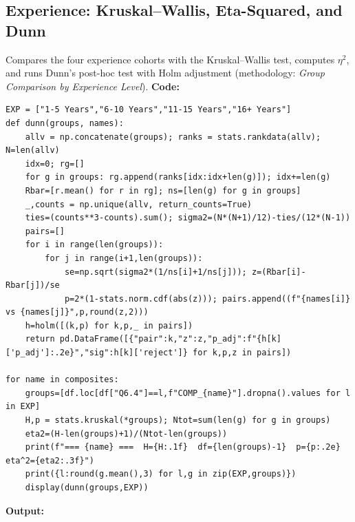 \subsection{Experience: Kruskal--Wallis, Eta-Squared, and Dunn}
Compares the four experience cohorts with the Kruskal--Wallis test, computes $\eta^2$, and runs Dunn's post-hoc test with Holm adjustment (methodology: \emph{Group Comparison by Experience Level}).
\noindent\textbf{Code:}\nopagebreak
{\tiny\begin{verbatim}
EXP = ["1-5 Years","6-10 Years","11-15 Years","16+ Years"]
def dunn(groups, names):
    allv = np.concatenate(groups); ranks = stats.rankdata(allv); N=len(allv)
    idx=0; rg=[]
    for g in groups: rg.append(ranks[idx:idx+len(g)]); idx+=len(g)
    Rbar=[r.mean() for r in rg]; ns=[len(g) for g in groups]
    _,counts = np.unique(allv, return_counts=True)
    ties=(counts**3-counts).sum(); sigma2=(N*(N+1)/12)-ties/(12*(N-1))
    pairs=[]
    for i in range(len(groups)):
        for j in range(i+1,len(groups)):
            se=np.sqrt(sigma2*(1/ns[i]+1/ns[j])); z=(Rbar[i]-Rbar[j])/se
            p=2*(1-stats.norm.cdf(abs(z))); pairs.append((f"{names[i]} vs {names[j]}",p,round(z,2)))
    h=holm([(k,p) for k,p,_ in pairs])
    return pd.DataFrame([{"pair":k,"z":z,"p_adj":f"{h[k]['p_adj']:.2e}","sig":h[k]['reject']} for k,p,z in pairs])

for name in composites:
    groups=[df.loc[df["Q6.4"]==l,f"COMP_{name}"].dropna().values for l in EXP]
    H,p = stats.kruskal(*groups); Ntot=sum(len(g) for g in groups)
    eta2=(H-len(groups)+1)/(Ntot-len(groups))
    print(f"=== {name} ===  H={H:.1f}  df={len(groups)-1}  p={p:.2e}  eta^2={eta2:.3f}")
    print({l:round(g.mean(),3) for l,g in zip(EXP,groups)})
    display(dunn(groups,EXP))
\end{verbatim}}
\noindent\textbf{Output:}\nopagebreak
